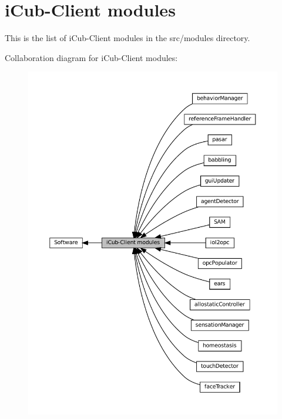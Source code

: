 \hypertarget{group__icubclient__modules}{}\section{i\+Cub-\/\+Client modules}
\label{group__icubclient__modules}


This is the list of i\+Cub-\/\+Client modules in the src/modules directory.  


Collaboration diagram for i\+Cub-\/\+Client modules\+:
\nopagebreak
\begin{figure}[H]
\begin{center}
\leavevmode
\includegraphics[width=350pt]{group__icubclient__modules}
\end{center}
\end{figure}

